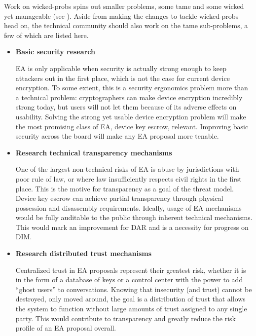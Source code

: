 Work on \acp{wicked-prob} spins out smaller problems, some tame and some wicked yet manageable (see
). Aside from making the changes to tackle \acp{wicked-prob} head on, the technical
community should also work on the tame sub-problems, a few of which are listed here.

\newcommand{\taskstart}[0]{\begin{itemize}}
\newcommand{\taskitem}[2]{ %
    \item \textbf{#1} \nopagebreak

    \vspace{0.5\baselineskip} \parbox{\linewidth}{#2} \vspace{0.5\baselineskip}
}
\newcommand{\taskend}{\end{itemize}}

\taskstart
    \taskitem{Basic security research}{

\ac{EA} is only applicable when security is actually strong enough to keep attackers out in the first place, which is
not the case for current device encryption. To some extent, this is a security ergonomics problem more than a technical
problem: cryptographers can make device encryption incredibly strong today, but users will not let them because of its
adverse effects on usability. Solving the strong yet usable device encryption problem will make the most promising class
of \ac{EA}, device key escrow, relevant. Improving basic security across the board will make any \ac{EA} proposal more
tenable.

}

    \taskitem{Research technical transparency mechanisms}{

One of the largest non-technical risks of \ac{EA} is abuse by jurisdictions with poor rule of law, or where law
insufficiently respects civil rights in the first place. This is the motive for transparency as a goal of the threat
model. Device key escrow can achieve partial transparency through physical possession and disassembly requirements.
Ideally, usage of \ac{EA} mechanisms would be fully auditable to the public through inherent technical mechanisms. This
would mark an improvement for \acl{DAR} and is a necessity for progress on \acl{DIM}.

}

    \taskitem{Research distributed trust mechanisms}{

Centralized trust in \ac{EA} proposals represent their greatest risk, whether it is in the form of a database of keys or
a control center with the power to add ``ghost users'' to conversations. Knowing that insecurity (and trust) cannot be
destroyed, only moved around, the goal is a distribution of trust that allows the system to function without large
amounts of trust assigned to any single party. This would contribute to transparency and greatly reduce the risk profile
of an \ac{EA} proposal overall.

}
\taskend

